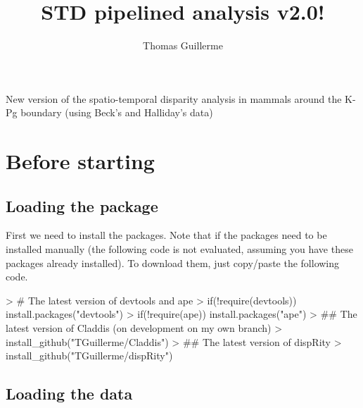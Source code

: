 \documentclass{article}
\begin{document}
\begin{Schunk}
\end{Schunk}


\title{STD pipelined analysis v2.0!}

\author{Thomas Guillerme}

\maketitle

New version of the spatio-temporal disparity analysis in mammals around the K-Pg boundary (using Beck's and Halliday's data)

\tableofcontents

\section{Before starting}

\subsection{Loading the package}
First we need to install the packages.
Note that if the packages need to be installed manually (the following code is not evaluated, assuming you have these packages already installed).
To download them, just copy/paste the following code.

\begin{Schunk}
\begin{Sinput}
> # The latest version of devtools and ape
> if(!require(devtools)) install.packages("devtools")
> if(!require(ape)) install.packages("ape")
> ## The latest version of Claddis (on development on my own branch)
> install_github("TGuillerme/Claddis")
> ## The latest version of dispRity 
> install_github("TGuillerme/dispRity")
\end{Sinput}
\end{Schunk}


\subsection{Loading the data}
\end{document}
